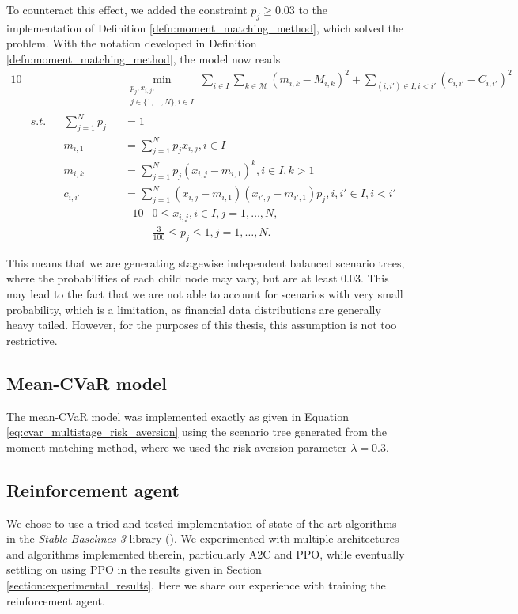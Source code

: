 To counteract this effect, we added the constraint $p_j \geq 0.03$ to the implementation of Definition \ref{defn:moment_matching_method}, which solved the problem. With the notation developed in Definition \ref{defn:moment_matching_method}, the model now reads
\begin{alignat}{10}
& && && \underset{\substack{p_j, x_{i,j}, \\ j \in \{1,...,N\}, i \in I}}{\min} \sum_{i\in I} \sum_{k\in \mathcal{M}} \left(m_{i,k} - M_{i,k}\right)^2 + \sum_{(i, i') \in I, i < i'}(c_{i,i'}-C_{i,i'})^2 \nonumber \\
& s.t. && \sum_{j=1}^N p_j&&=1 \nonumber \\
& && m_{i,1}&&=\sum_{j=1}^N p_jx_{i,j}, i \in I \nonumber \\
& && m_{i,k}&&=\sum_{j=1}^N p_j(x_{i,j}-m_{i,1})^k, i \in I, k>1 \nonumber \\
& && c_{i,i'}&&=\sum_{j=1}^N(x_{i,j}-m_{i,1})(x_{i',j}-m_{i',1})p_j, i,i' \in I, i<i' \nonumber
\end{alignat}
\vspace{-0.5cm}
\begin{alignat}{10}
& 0  \leq x_{i,j}, i \in I, j=1,\dots,N, \nonumber \\
& \frac{3}{100} \leq p_j \leq 1, j=1,\dots,N. \nonumber
\end{alignat}

This means that we are generating stagewise independent balanced scenario trees, where the probabilities of each child node may vary, but are at least 0.03. This may lead to the fact that we are not able to account for scenarios with very small probability, which is a limitation, as financial data distributions are generally heavy tailed. However, for the purposes of this thesis, this assumption is not too restrictive.


\subsection{Mean-CVaR model}
The mean-CVaR model was implemented exactly as given in Equation \ref{eq:cvar_multistage_risk_aversion} using the scenario tree generated from the moment matching method, where we used the risk aversion parameter $\lambda=0.3.$ 

\subsection{Reinforcement agent}
We chose to use a tried and tested implementation of state of the art algorithms in the \textit{Stable Baselines 3} library (\cite{stable_baselines3}). We experimented with multiple architectures and algorithms implemented therein, particularly A2C and PPO, while eventually settling on using PPO in the results given in Section \ref{section:experimental_results}. Here we share our experience with training the reinforcement agent.


